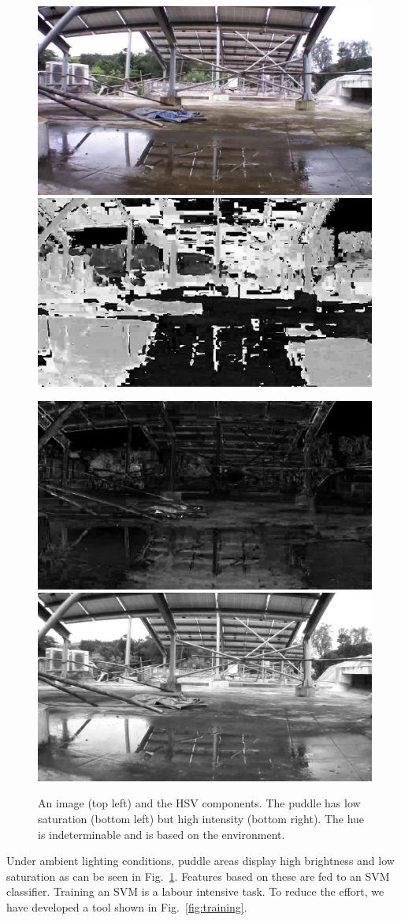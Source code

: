 \documentclass[times,10pt,twocolumn]{article}
\begin{document}
\begin{figure}[h!]
  \centering
  \includegraphics[width=0.4\linewidth]{images/IMG_PAIR_27_1} \hfill
  \includegraphics[width=0.4\linewidth]{images/IMG_PAIR_27_1_H} 

  \includegraphics[width=0.4\linewidth]{images/IMG_PAIR_27_1_S} \hfill
  \includegraphics[width=0.4\linewidth]{images/IMG_PAIR_27_1_V}
  \caption{An image (top left) and the HSV components.  The puddle has
    low saturation (bottom left) but high intensity (bottom right).
    The hue is indeterminable and is based on the environment.}
  \label{fig:HSV}
\end{figure}

Under ambient lighting conditions, puddle areas display high
brightness and low saturation as can be seen in
Fig.~\ref{fig:HSV}. Features based on these are fed to an SVM
classifier. Training an SVM is a labour intensive task.  To reduce the
effort, we have developed a tool shown in
Fig.~\ref{fig:training}. 

 
\end{document}
